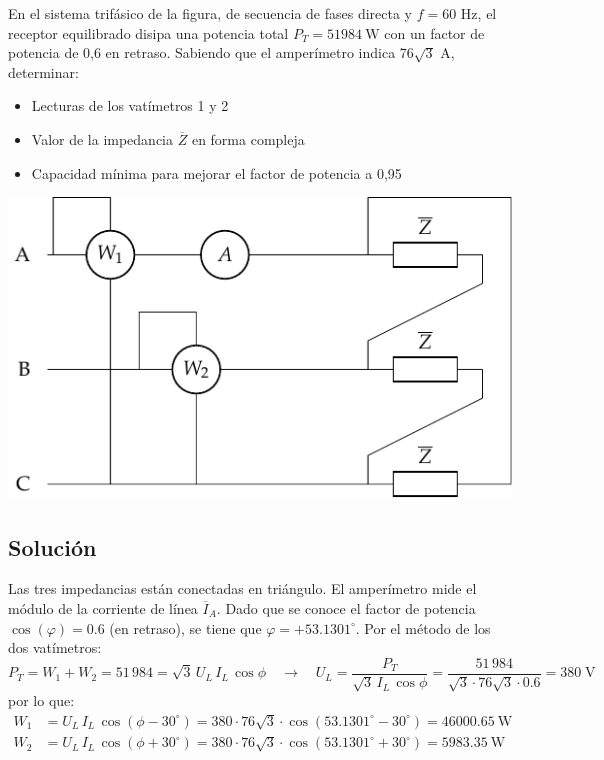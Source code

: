 En el sistema trifásico de la figura, de secuencia de fases directa y $f=60$ Hz, el receptor equilibrado disipa una potencia total $P_T = \qty{51984}{\watt}$ con un factor de potencia de 0,6 en
retraso. Sabiendo que el amperímetro indica 76$\sqrt{3}$ A,
determinar:
\begin{itemize}
    \item  Lecturas de los vatímetros 1 y 2
    \item  Valor de la impedancia $\overline{Z}$ en forma compleja
    \item Capacidad mínima para mejorar el factor de potencia a 0,95
\end{itemize}

\begin{center}
  \includegraphics[width=0.53\linewidth]{figuras/ej4_BT3.pdf}
\end{center}


\subsection*{Solución}
Las tres impedancias están conectadas en triángulo. El amperímetro mide el módulo de la corriente de línea $\overline{I}_A$. Dado que se conoce el factor de potencia $\cos(\varphi)=0.6$ (en retraso), se tiene que $\varphi=+53.1301^\circ$. Por el método de los dos vatímetros:
\begin{equation*}
    P_T=W_1+W_2=51\,984=\sqrt{3}\, U_L\, I_L\, \cos{\phi}\quad\rightarrow\quad U_L=\dfrac{P_T}{\sqrt{3}\, I_L\,\cos{\phi}}=\dfrac{51\,984}{\sqrt{3}\cdot 76\sqrt{3}\cdot 0.6}=380\;\text{V}
\end{equation*}
por lo que: 
\begin{align*}
    W_1&=U_L\,I_L\,\cos(\phi-30^\circ)=380\cdot 76\sqrt{3}\cdot\cos(53.1301^\circ-30^\circ)=\qty{46000.65}{\watt}\\
    W_2&=U_L\,I_L\,\cos(\phi+30^\circ)=380\cdot 76\sqrt{3}\cdot\cos(53.1301^\circ+30^\circ)=\qty{5983.35}{\watt}
\end{align*}
  
